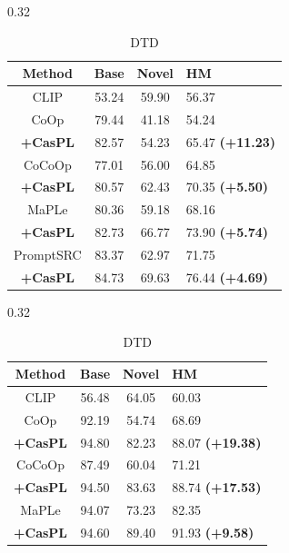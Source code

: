 \documentclass[runningheads]{llncs}
\newcommand{\improve}[1]{\textcolor{boost_line}{\textbf{#1}}}
\begin{document}
{{\begin{table}[!t]
    \begin{subtable}[t]{0.32\linewidth}
        \resizebox{0.96\linewidth}{!}
        {
        \begin{tabular}{c|ccl}
            \hline
            Method    & Base  & Novel & HM \\
            \hline
            CLIP & 53.24 & 59.90 & 56.37 \\
            \hline
            CoOp & 79.44 & 41.18 & 54.24 \\ 
            \rowcolor{tablecolor} \textbf{+CasPL} &82.57 	&54.23 	&65.47     \small\improve{(+11.23)}  \\
            \hline
            CoCoOp & 77.01 & 56.00 & 64.85 \\
            \rowcolor{tablecolor} \textbf{+CasPL} &80.57 	&62.43 	&70.35    \improve{(+5.50)}  \\
            \hline
            MaPLe & 80.36 & 59.18 & 68.16 \\
            \rowcolor{tablecolor} \textbf{+CasPL} &82.73 	&66.77 	&73.90   \improve{(+5.74)} \\
            \hline
            PromptSRC & 83.37 & 62.97 & 71.75 \\
            \rowcolor{tablecolor} \textbf{+CasPL} &84.73     &69.63  &76.44   \improve{(+4.69)} \\
            \hline
        \end{tabular}
        }
        \caption{DTD}
    \end{subtable}
    \begin{subtable}[t]{0.32\linewidth}
        \resizebox{0.96\linewidth}{!}
        {
        \begin{tabular}{c|ccl}
            \hline
            Method    & Base  & Novel & HM \\
            \hline
            CLIP & 56.48 & 64.05 & 60.03 \\
            \hline
            CoOp & 92.19 & 54.74 & 68.69 \\
            \rowcolor{tablecolor} \textbf{+CasPL} &94.80 	&82.23 	&88.07     \small\improve{(+19.38)}  \\
            \hline
            CoCoOp & 87.49 & 60.04 & 71.21 \\
            \rowcolor{tablecolor} \textbf{+CasPL} &94.50 	 &83.63 	 &88.74    \small\improve{(+17.53)} \\
            \hline
            MaPLe & 94.07 & 73.23 & 82.35 \\
            \rowcolor{tablecolor} \textbf{+CasPL} &94.60 	&89.40 	&91.93   \improve{(+9.58)} \\

\end{tabular}}
\end{subtable}
\end{table}}}
\end{document}
